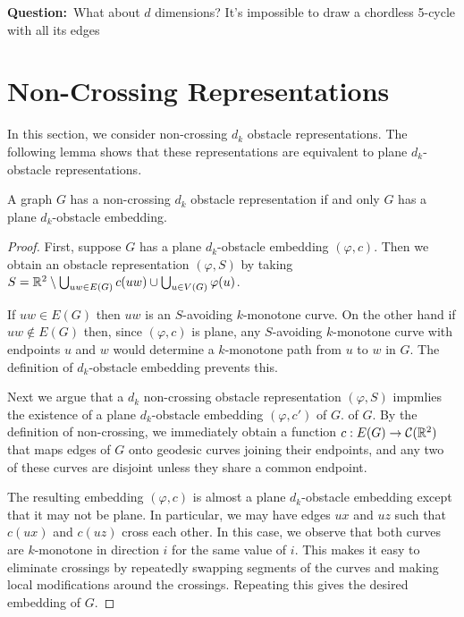 \documentclass{patmorin}
\newcommand{\question}[1]{\textbf{\color{red}Question:}~#1}
\begin{document}
\question{What about $d$ dimensions?  It's impossible to draw a chordless
5-cycle with all its edges}


\section{Non-Crossing Representations}

In this section, we consider non-crossing $d_k$ obstacle
representations. The following lemma shows that these representations
are equivalent to plane $d_k$-obstacle representations.

\begin{lem}
   A graph $G$ has a non-crossing $d_k$ obstacle representation if and
   only $G$ has a plane $d_k$-obstacle embedding.
\end{lem}

\begin{proof}
   First, suppose $G$ has a plane $d_k$-obstacle embedding $(\varphi,c)$.
   Then we obtain an obstacle representation $(\varphi,S)$ by taking
   $S= \mathbb{R}^2\setminus \bigcup_{uw\in E(G)} c(uw)\cup \bigcup_{u\in
   V(G)}\varphi(u)$.

   If $uw\in E(G)$ then $uw$ is an $S$-avoiding $k$-monotone curve.
   On the other hand if $uw\not\in E(G)$ then, since $(\varphi,c)$
   is plane, any $S$-avoiding $k$-monotone curve with endpoints $u$
   and $w$ would determine a $k$-monotone path from $u$ to $w$ in $G$.
   The definition of $d_k$-obstacle embedding prevents this.

   Next we argue that a $d_k$ non-crossing obstacle representation
   $(\varphi, S)$ impmlies the existence of a plane $d_k$-obstacle
   embedding $(\varphi, c')$ of $G$.  of $G$.  By the
   definition of non-crossing, we immediately obtain a function
   $c:E(G)\to\mathcal{C}(\mathbb{R}^2)$ that maps edges of $G$ onto geodesic
   curves joining their endpoints, and any two of these curves are
   disjoint unless they share a common endpoint.

   The resulting embedding $(\varphi,c)$ is almost a plane $d_k$-obstacle
   embedding except that it may not be plane.  In particular, we may
   have edges $ux$ and $uz$ such that $c(ux)$ and $c(uz)$ cross each
   other.  In this case, we observe that both curves are $k$-monotone
   in direction $i$ for the same value of $i$.  This makes it easy to
   eliminate crossings by repeatedly swapping segments of the curves
   and making local modifications around the crossings.  Repeating this
   gives the desired embedding of $G$.
\end{proof}
\end{document}
